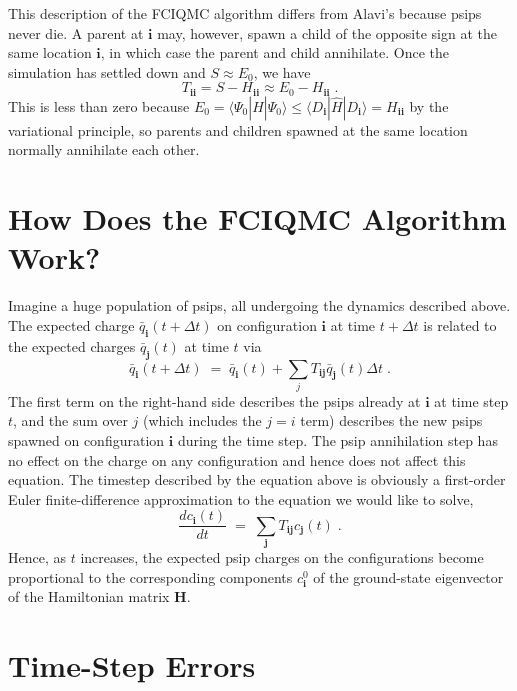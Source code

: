 \documentclass{article}
\newcommand{\bi}{\boldsymbol{i}}
\newcommand{\bj}{\boldsymbol{j}}
\newcommand{\bH}{\boldsymbol{H}}
\begin{document}
This description of the FCIQMC algorithm differs from Alavi's because
psips never die. A parent at $\bi$ may, however, spawn a child of the
opposite sign at the same location $\bi$, in which case the parent and
child annihilate. Once the simulation has settled down and $S \approx
E_0$, we have
\begin{displaymath}
T_{\bi\bi} = S - H_{\bi\bi} \approx E_0 - H_{\bi\bi} \;.
\end{displaymath}
This is less than zero because $E_0 = \langle \Psi_0 | \hat{H} |
\Psi_0 \rangle \leq \langle D_{\bi} | \hat{H} | D_{\bi} \rangle =
H_{\bi\bi}$ by the variational principle, so parents and children
spawned at the same location normally annihilate each other.


\section{How Does the FCIQMC Algorithm Work?}
\label{sec:HowFCIQMCWorks}

Imagine a huge population of psips, all undergoing the dynamics
described above.  The expected charge $\bar{q}_{\bi}(t + \Delta t)$ on
configuration $\bi$ at time $t + \Delta t$ is related to the expected
charges $\bar{q}_{\bj}(t)$ at time $t$ via
\begin{displaymath}
\bar{q}_{\bi}(t + \Delta t) \; = \; \bar{q}_{\bi}(t) + \sum_{j}
T_{\bi\bj} \bar{q}_{\bj}(t) \Delta t \;.
\end{displaymath}
The first term on the right-hand side describes the psips already at
$\bi$ at time step $t$, and the sum over $j$ (which includes the $j=i$
term) describes the new psips spawned on configuration $\bi$ during
the time step. The psip annihilation step has no effect on the charge
on any configuration and hence does not affect this equation. The
timestep described by the equation above is obviously a first-order
Euler finite-difference approximation to the equation we would like to
solve,
\begin{displaymath}
\frac{d c_{\bi}(t)}{dt} \; = \; \sum_{\bj} T_{\bi\bj} c_{\bj}(t) \;.
\end{displaymath}
Hence, as $t$ increases, the expected psip charges on the
configurations become proportional to the corresponding components
$c_{\bi}^0$ of the ground-state eigenvector of the Hamiltonian matrix
$\bH$.

\section{Time-Step Errors}
\label{sec:TimeStepErrors}
\end{document}
